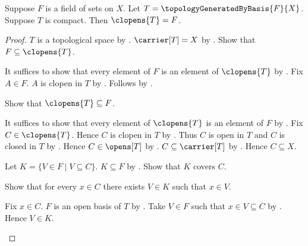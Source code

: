 \begin{theorem}\label{compact_field_generated_topology_clopens}
    Suppose $F$ is a field of sets on $X$.
    Let $T=\topologyGeneratedByBasis{F}{X}$.
    Suppose $T$ is compact.
    Then $\clopens{T}=F$.
\end{theorem}
\begin{proof}
    $T$ is a topological space by
        .
    $\carrier[T]=X$ by
        .
    Show that $F\subseteq\clopens{T}$.
    \begin{subproof}
        It suffices to show that every element of $F$ is an element of
            $\clopens{T}$ by .
        Fix $A\in F$.
        $A$ is clopen in $T$ by
            .
        Follows by .
    \end{subproof}

    Show that $\clopens{T}\subseteq F$.
    \begin{subproof}
        It suffices to show that every element of $\clopens{T}$ is an
            element of $F$ by .
        Fix $C\in\clopens{T}$.
        Hence $C$ is clopen in $T$ by .
        Thus $C$ is open in $T$ and $C$ is closed in $T$ by
            .
        Hence $C\in\opens[T]$ by .
        $C\subseteq\carrier[T]$ by
            .
        Hence $C\subseteq X$.

        Let $K=\{V\in F\mid V\subseteq C\}$.
        $K\subseteq F$ by .
        Show that $K$ covers $C$.
        \begin{subproof}
            Show that for every $x\in C$ there exists $V\in K$ such
                that $x\in V$.
            \begin{subproof}
                Fix $x\in C$.
                $F$ is an open basis of $T$ by
                    .
                Take $V\in F$ such that $x\in V\subseteq C$ by
                    .
                Hence $V\in K$.
            \end{subproof}
        \end{subproof}


\end{subproof}
\end{proof}
